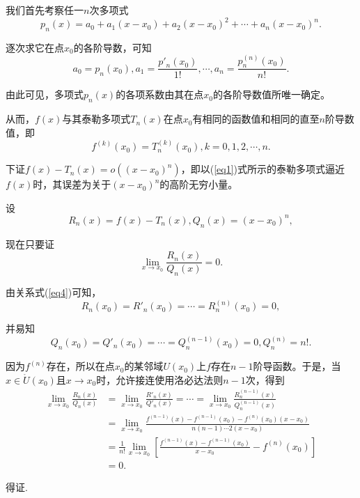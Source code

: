 \documentclass{ctexart}
\begin{document}
我们首先考察任一$n$次多项式
\begin{equation}\label{eq3}
	p_n(x)=a_0+a_1(x-x_0)+a_2(x-x_0)^2+\cdots+a_n(x-x_0)^n.
\end{equation}

逐次求它在点$x_0$的各阶导数，可知
$$a_0=p_n(x_0),a_1=\displaystyle\frac{p'_n(x_0)}{1!},\cdots,a_n=\displaystyle\frac{p_n^{(n)}(x_0)}{n!}.$$

由此可见，多项式$p_n(x)$的各项系数由其在点$x_0$的各阶导数值所唯一确定。

从而，$f(x)$与其泰勒多项式$T_n(x)$在点$x_0$有相同的函数值和相同的直至$n$阶导数值，即
\begin{equation}\label{eq4}
	f^{(k)}(x_0)=T_n^{(k)}(x_0),k=0,1,2,\cdots,n.
\end{equation}

下证$f(x)-T_n(x)=o((x-x_0)^n)$，即以(\ref{eq1})式所示的泰勒多项式逼近$f(x)$时，其误差为关于$(x-x_0)^n$的高阶无穷小量。

设
\begin{equation}\label{eq5}
	R_n(x)=f(x)-T_n(x),Q_n(x)=(x-x_0)^n,
\end{equation}

现在只要证
\begin{equation}\label{eq6}
	\lim\limits_{x\rightarrow x_0}\displaystyle\frac{R_n(x)}{Q_n(x)}=0.
\end{equation}

由关系式(\ref{eq4})可知，
$$R_n(x_0)=R'_n(x_0)=\cdots=R_n^{(n)}(x_0)=0,$$

并易知
$$Q_n(x_0)=Q'_n(x_0)=\cdots=Q_n^{(n-1)}(x_0)=0,Q_n^{(n)}=n!.$$

因为$f^{(n)}$存在，所以在点$x_0$的某邻域$U(x_0)$上$f$存在$n-1$阶导函数。于是，当$x\in \mathring{U}(x_0)$且$x\rightarrow x_0$时，允许接连使用洛必达法则$n-1$次，得到
\begin{equation}\label{eq7}
	\begin{aligned}
		\lim\limits_{x\rightarrow x_0}\displaystyle\frac{R_n(x)}{Q_n(x)} & =\lim\limits_{x\rightarrow x_0}\displaystyle\frac{R'_n(x)}{Q'_n(x)}=\cdots=\lim\limits_{x\rightarrow x_0}\displaystyle\frac{R_n^{(n-1)}(x)}{Q_n^{(n-1)}(x)}\\
		& =\lim\limits_{x\rightarrow x_0}\displaystyle\frac{f^{(n-1)}(x)-f^{(n-1)}(x_0)-f^{(n)}(x_0)(x-x_0)}{n(n-1)\cdots 2(x-x_0)}\\
		& =\displaystyle\frac{1}{n!}\lim\limits_{x\rightarrow x_0}\left[\displaystyle\frac{f^{(n-1)}(x)-f^{(n-1)}(x_0)}{x-x_0}-f^{(n)}(x_0)\right]\\
		& =0.
	\end{aligned}
\end{equation}

得证.
\end{document}
